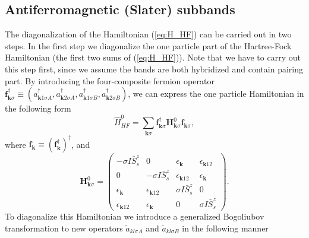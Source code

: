 \documentclass[aps,prb,showpacs,reprint]{revtex4-1}
\begin{document}
\subsection{Antiferromagnetic (Slater) subbands}
The diagonalization of the Hamiltonian (\ref{eq:H_HF}) can be carried out in two
steps. In the first step we diagonalize the one particle part of the
Hartree-Fock Hamiltonian (the first two sums of (\ref{eq:H_HF})). Note that we have to carry out this step first, since we assume the bands are both hybridized and contain pairing part. By
introducing the four-composite fermion operator
$\mathbf{f}^{\dagger}_{\mathbf{k}\sigma}\equiv(a^{\dagger}_{
\mathbf{k}1\sigma
A},a^{\dagger}_{\mathbf{k}2\sigma A},
a^{\dagger}_{\mathbf{k}1\sigma
B},a^{\dagger}_{\mathbf{k}2\sigma B})$, we can express the one particle
Hamiltonian in the following form
\begin{equation}
\hat{H}^0_{HF}=\sum_{\mathbf{k}\sigma}
\mathbf{f}_{\mathbf{k}\sigma}^{\dagger}\mathbf{H}^0_{\mathbf{k}\sigma}
\mathbf{f}_{\mathbf{k}\sigma},
\end{equation}
where
$\mathbf{f}_{\mathbf{k}}\equiv(\mathbf{f}^{\dagger}_{\mathbf{k}})^{\dagger}$,
and
\begin{equation}
\mathbf{H}^0_{\mathbf{k}\sigma}=\left(\begin{array}{cccc}
-\sigma I\bar{S}^z_s & 0 & \epsilon_{\mathbf{k}} & \epsilon_{\mathbf{k}12}\\
0 & -\sigma I\bar{S}^z_s & \epsilon_{\mathbf{k}12} & \epsilon_{\mathbf{k}}\\
\epsilon_{\mathbf{k}} & \epsilon_{\mathbf{k}12} & \sigma I\bar{S}^z_s & 0\\
\epsilon_{\mathbf{k}12} & \epsilon_{\mathbf{k}} & 0 &\sigma I\bar{S}^z_s
\end{array} \right).
\label{eq:matrix_H}
\end{equation}
To diagonalize this Hamiltonian we introduce a generalized Bogoliubov transformation to new
operators $\tilde{a}_{kl\sigma A}$ and $\tilde{a}_{kl\sigma
B}$ in the following manner
\end{document}
